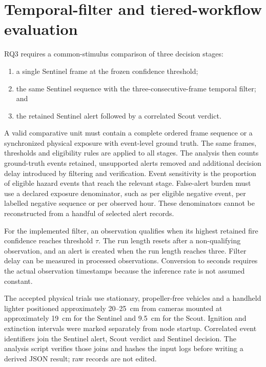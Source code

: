 \section{Temporal-filter and tiered-workflow evaluation}
\label{sec:methodology:5}

RQ3 requires a common-stimulus comparison of three decision stages:

\begin{enumerate}
  \item a single Sentinel frame at the frozen confidence threshold;
  \item the same Sentinel sequence with the three-consecutive-frame temporal
  filter; and
  \item the retained Sentinel alert followed by a correlated Scout verdict.
\end{enumerate}

A valid comparative unit must contain a complete ordered frame sequence or a
synchronized physical exposure with event-level ground truth. The same frames,
thresholds and eligibility rules are applied to all stages. The analysis then
counts ground-truth events retained, unsupported alerts removed and additional
decision delay introduced by filtering and verification. Event sensitivity is
the proportion of eligible hazard events that reach the relevant stage.
False-alert burden must use a declared exposure denominator, such as per
eligible negative event, per labelled negative sequence or per observed hour.
These denominators cannot be reconstructed from a handful of selected alert
records.

For the implemented filter, an observation qualifies when its highest retained
fire confidence reaches threshold \(\tau\). The run length resets after a
non-qualifying observation, and an alert is created when the run length reaches
three. Filter delay can be measured in processed observations. Conversion to
seconds requires the actual observation timestamps because the inference rate
is not assumed constant.

The accepted physical trials use stationary, propeller-free vehicles and a
handheld lighter positioned approximately 20--25~cm from cameras mounted at
approximately 19~cm for the Sentinel and 9.5~cm for the Scout. Ignition and
extinction intervals were marked separately from node startup. Correlated
event identifiers join the Sentinel alert, Scout verdict and Sentinel decision.
The analysis script verifies those joins and hashes the input logs before
writing a derived JSON result; raw records are not edited.

